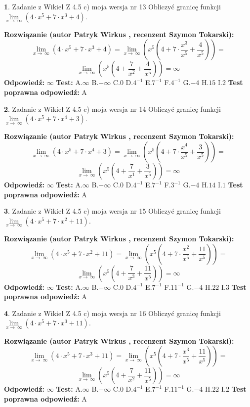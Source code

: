\documentclass[12pt, a4paper]{article}
\theoremstyle{definition} %
\newtheorem{zad}{}
\newcommand{\zadStart}[1]{\begin{zad}#1\newline}
\newcommand{\zadStop}{\end{zad}}
\newcommand{\rozwStart}[2]{\noindent \textbf{Rozwiązanie (autor #1 , recenzent #2): }\newline}
\newcommand{\rozwStop}{\newline}
\newcommand{\odpStart}{\noindent \textbf{Odpowiedź:}\newline}
\newcommand{\odpStop}{\newline}
\newcommand{\testStart}{\noindent \textbf{Test:}\newline}
\newcommand{\testStop}{\newline}
\newcommand{\kluczStart}{\noindent \textbf{Test poprawna odpowiedź:}\newline}
\newcommand{\kluczStop}{\newline}
\begin{document}
\zadStart{Zadanie z Wikieł Z 4.5 c) moja wersja nr 13}
Obliczyć granicę funkcji  $\lim\limits_{x\to\ \infty}(4 \cdot x^{5}+7 \cdot x^{3}+4)$.
\zadStop
\rozwStart{Patryk Wirkus}{Szymon Tokarski}
$$\lim\limits_{x\to\ \infty}(4 \cdot x^{5}+7 \cdot x^{3}+4) = \lim\limits_{x\to\ \infty}(x^{5}(4 +7 \cdot \frac{x^{3}}{x^{5}}+\frac{4}{x^{5}})) =$$ $$\lim\limits_{x\to\ \infty}(x^{5}(4 +\frac{7}{x^{2}}+\frac{4}{x^{5}})) =\infty$$
\rozwStop
\odpStart
$\infty$
\odpStop
\testStart
A.$\infty$ B.$-\infty$ C.$0$ D.$4^{-1}$ E.$7^{-1}$
F.$4^{-1}$ G.$-4$
H.$15$
I.$2$
\testStop
\kluczStart
A
\kluczStop



\zadStart{Zadanie z Wikieł Z 4.5 c) moja wersja nr 14}
Obliczyć granicę funkcji  $\lim\limits_{x\to\ \infty}(4 \cdot x^{5}+7 \cdot x^{4}+3)$.
\zadStop
\rozwStart{Patryk Wirkus}{Szymon Tokarski}
$$\lim\limits_{x\to\ \infty}(4 \cdot x^{5}+7 \cdot x^{4}+3) = \lim\limits_{x\to\ \infty}(x^{5}(4 +7 \cdot \frac{x^{4}}{x^{5}}+\frac{3}{x^{5}})) =$$ $$\lim\limits_{x\to\ \infty}(x^{5}(4 +\frac{7}{x^{1}}+\frac{3}{x^{5}})) =\infty$$
\rozwStop
\odpStart
$\infty$
\odpStop
\testStart
A.$\infty$ B.$-\infty$ C.$0$ D.$4^{-1}$ E.$7^{-1}$
F.$3^{-1}$ G.$-4$
H.$14$
I.$1$
\testStop
\kluczStart
A
\kluczStop



\zadStart{Zadanie z Wikieł Z 4.5 c) moja wersja nr 15}
Obliczyć granicę funkcji  $\lim\limits_{x\to\ \infty}(4 \cdot x^{5}+7 \cdot x^{2}+11)$.
\zadStop
\rozwStart{Patryk Wirkus}{Szymon Tokarski}
$$\lim\limits_{x\to\ \infty}(4 \cdot x^{5}+7 \cdot x^{2}+11) = \lim\limits_{x\to\ \infty}(x^{5}(4 +7 \cdot \frac{x^{2}}{x^{5}}+\frac{11}{x^{5}})) =$$ $$\lim\limits_{x\to\ \infty}(x^{5}(4 +\frac{7}{x^{3}}+\frac{11}{x^{5}})) =\infty$$
\rozwStop
\odpStart
$\infty$
\odpStop
\testStart
A.$\infty$ B.$-\infty$ C.$0$ D.$4^{-1}$ E.$7^{-1}$
F.$11^{-1}$ G.$-4$
H.$22$
I.$3$
\testStop
\kluczStart
A
\kluczStop



\zadStart{Zadanie z Wikieł Z 4.5 c) moja wersja nr 16}
Obliczyć granicę funkcji  $\lim\limits_{x\to\ \infty}(4 \cdot x^{5}+7 \cdot x^{3}+11)$.
\zadStop
\rozwStart{Patryk Wirkus}{Szymon Tokarski}
$$\lim\limits_{x\to\ \infty}(4 \cdot x^{5}+7 \cdot x^{3}+11) = \lim\limits_{x\to\ \infty}(x^{5}(4 +7 \cdot \frac{x^{3}}{x^{5}}+\frac{11}{x^{5}})) =$$ $$\lim\limits_{x\to\ \infty}(x^{5}(4 +\frac{7}{x^{2}}+\frac{11}{x^{5}})) =\infty$$
\rozwStop
\odpStart
$\infty$
\odpStop
\testStart
A.$\infty$ B.$-\infty$ C.$0$ D.$4^{-1}$ E.$7^{-1}$
F.$11^{-1}$ G.$-4$
H.$22$
I.$2$
\testStop
\kluczStart
A
\kluczStop
\end{document}
